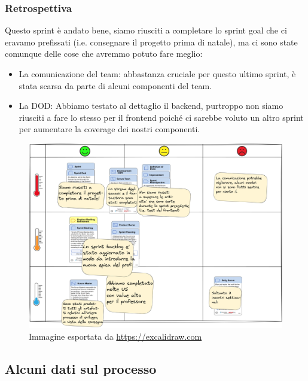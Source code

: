 \documentclass{article}
\begin{document}
\subsubsection{Retrospettiva}
Questo sprint \`e andato bene, siamo riusciti a completare lo sprint goal che ci eravamo prefissati (i.e. consegnare il progetto prima di natale), ma ci sono state comunque delle cose che avremmo potuto fare meglio:
\begin{itemize}
\item La comunicazione del team: abbastanza cruciale per questo ultimo sprint, \`e stata scarsa da parte di alcuni componenti del team.
\item La DOD: Abbiamo testato al dettaglio il backend, purtroppo non siamo riusciti a fare lo stesso per il frontend poich\'e ci sarebbe voluto un altro sprint per aumentare la coverage dei nostri componenti.
\end{itemize}
\begin{figure}[H]
    \centering
    \includegraphics[scale=0.065]{retrospettive/retrospettiva-sprint4.png}
    \caption{Immagine esportata da \href{https://excalidraw.com/}{https://excalidraw.com}}
    \label{fig:retrospettiva4}
\end{figure}
\subsection{Alcuni dati sul processo}
\end{document}

